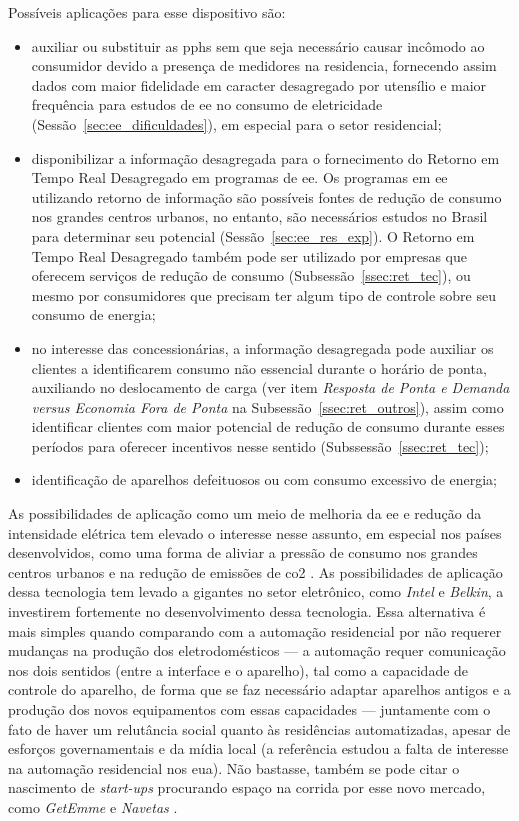 Possíveis aplicações para esse dispositivo são: 

\begin{itemize}
\item auxiliar ou substituir as \glspl{pph} sem que seja necessário
causar incômodo ao consumidor devido a presença de medidores na
residencia, fornecendo assim dados com maior fidelidade em caracter
desagregado por utensílio e maior frequência para estudos de \gls{ee}
no consumo de eletricidade (Sessão~\ref{sec:ee_dificuldades}), em
especial para o setor residencial;
\item disponibilizar a informação desagregada para o fornecimento do
Retorno em Tempo Real Desagregado em programas de \gls{ee}. Os
programas em \gls{ee} utilizando retorno de informação são possíveis
fontes de redução de consumo nos grandes centros urbanos, no entanto,
são necessários estudos no Brasil para determinar seu potencial 
(Sessão~\ref{sec:ee_res_exp}). O Retorno em Tempo Real Desagregado
também pode ser utilizado por empresas que oferecem serviços de
redução de consumo (Subsessão~\ref{ssec:ret_tec}), ou mesmo por
consumidores que precisam ter algum tipo de controle sobre seu consumo
de energia;
\item no interesse das concessionárias, a informação desagregada pode
auxiliar os clientes a identificarem consumo não essencial durante o
horário de ponta, auxiliando no deslocamento de carga (ver item
\emph{Resposta de Ponta e Demanda versus Economia Fora de Ponta} na
Subsessão~\ref{ssec:ret_outros}), assim como identificar clientes com
maior potencial de redução de consumo durante esses períodos para
oferecer incentivos nesse sentido (Subssessão~\ref{ssec:ret_tec}); 
\item identificação de aparelhos defeituosos ou com consumo excessivo
de energia;
\end{itemize}

As possibilidades de aplicação como um meio de melhoria da \gls{ee} e
redução da intensidade elétrica tem elevado o interesse nesse assunto,
em especial nos países desenvolvidos, como uma forma de aliviar
a pressão de consumo nos grandes centros urbanos e na redução de
emissões de \gls{co2} \cite{nilm_zeifman_review_2011}.
As possibilidades de aplicação dessa tecnologia tem levado a gigantes
no setor eletrônico, como \emph{Intel} e \emph{Belkin}, a investirem
fortemente no desenvolvimento dessa tecnologia. Essa
alternativa é mais simples quando comparando com a automação
residencial por não requerer mudanças na produção dos eletrodomésticos
--- a automação requer comunicação nos dois sentidos (entre a
interface e o aparelho), tal como a capacidade de controle do
aparelho, de forma que se faz necessário adaptar aparelhos antigos e a
produção dos novos equipamentos com essas capacidades --- juntamente
com o fato de haver um relutância social quanto às residências
automatizadas, apesar de esforços governamentais e da mídia local
\cite{Lipoff_Automation_2010} (a referência estudou a falta de
interesse na automação residencial nos \gls{eua}). Não bastasse,
também se pode citar o nascimento de \emph{start-ups}
procurando espaço na corrida por esse novo mercado, como
\emph{GetEmme} \cite{getemme_site} e \emph{Navetas}
\cite{navetas_site}.

